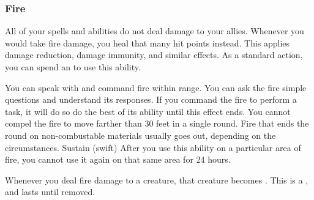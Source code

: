         \subsubsection{Fire}
             All of your  spells and abilities do not deal damage to your allies.
             Whenever you would take fire damage, you heal that many hit points instead.
            This applies damage reduction, damage immunity, and similar effects.
             As a standard action, you can spend an  to use this ability.
            \begin{ability}
                \begin{spelltargetinginfo}
                    \spellrng{\rnglong}
                \end{spelltargetinginfo}
                \begin{spelleffects}
                    \spelleffect You can speak with and command fire within range.
                    You can ask the fire simple questions and understand its responses.
                    If you command the fire to perform a task, it will do so do the best of its ability until this effect ends.
                    You cannot compel the fire to move farther than 30 feet in a single round.
                    Fire that ends the round on non-combustable materials usually goes out, depending on the circumstances.
                    \spelldur Sustain (swift)
                    \spellspecial After you use this ability on a particular area of fire, you cannot use it again on that same area for 24 hours.
                \end{spelleffects}
            \end{ability}
             Whenever you deal fire damage to a creature, that creature becomes \ignited.
            This is a , and lasts until removed.

